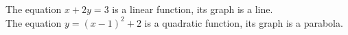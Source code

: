 \documentclass[12pt,a4paper]{article}
\begin{document}
The equation $x + 2y = 3$ is a linear function, its graph is a line. \\
The equation $y = (x-1)^2 + 2$ is a quadratic function, its graph is a parabola. \\
\end{document}
